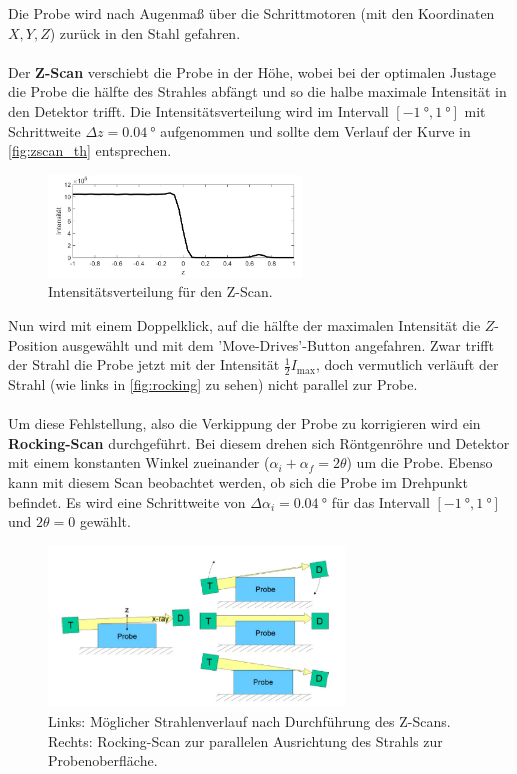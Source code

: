 Die Probe wird nach Augenmaß über die Schrittmotoren (mit den Koordinaten $X, Y, Z$) zurück in den Stahl gefahren.
\\
\\
Der \textbf{Z-Scan} verschiebt die Probe in der Höhe, wobei bei der optimalen Justage die Probe die hälfte des Strahles abfängt und so die halbe maximale Intensität in den Detektor trifft.
Die Intensitätsverteilung wird im Intervall $[\SI{-1}{\degree}, \SI{1}{\degree}]$ mit Schrittweite $\Delta z = \SI{0.04}{\degree}$ aufgenommen und sollte dem Verlauf der Kurve in \autoref{fig:zscan_th} entsprechen.
\begin{figure}
    \centering
    \includegraphics[width=0.6\textwidth]{content/data/zscan.jpg}
    \caption{Intensitätsverteilung für den Z-Scan.\cite[6]{anleitung}}
    \label{fig:zscan_th}
\end{figure}
Nun wird mit einem Doppelklick, auf die hälfte der maximalen Intensität die $Z$-Position ausgewählt und mit dem 'Move-Drives'-Button angefahren.
Zwar trifft der Strahl die Probe jetzt mit der Intensität $\frac{1}{2}I_\text{max}$, doch vermutlich verläuft der Strahl (wie links in \autoref{fig:rocking} zu sehen) nicht parallel zur Probe.
\\
\\
Um diese Fehlstellung, also die Verkippung der Probe zu korrigieren wird ein \textbf{Rocking-Scan} durchgeführt.
Bei diesem drehen sich Röntgenröhre und Detektor mit einem konstanten Winkel zueinander ($\alpha_i + \alpha_f = 2 \theta$) um die Probe.
Ebenso kann mit diesem Scan beobachtet werden, ob sich die Probe im Drehpunkt befindet.
Es wird eine Schrittweite von $\Delta \alpha_i = \SI{0.04}{\degree}$ für das Intervall $[\SI{-1}{\degree}, \SI{1}{\degree}]$ und $2 \theta = 0$ gewählt.
\begin{figure}
    \centering
    \includegraphics[width=0.7\textwidth]{content/data/rocking_zscan.jpg}
    \caption{Links: Möglicher Strahlenverlauf nach Durchführung des Z-Scans. \\ Rechts: Rocking-Scan zur parallelen Ausrichtung des Strahls zur Probenoberfläche.\cite[5]{anleitung}}
    \label{fig:rocking_zscan}
\end{figure}
